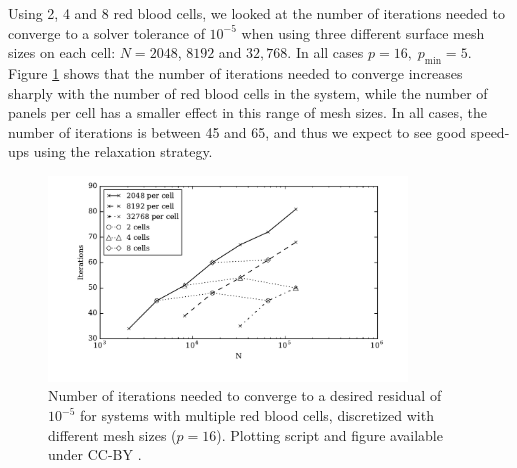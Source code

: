 \documentclass[final,3p,times]{elsarticle}
\begin{document}
Using 2, 4 and 8 red blood cells, we looked at the number of iterations needed to converge to a solver tolerance of $10^{-5}$ when using three different surface mesh sizes on each cell: $N=2048$, $8192$ and $32,768$. In all cases $p = 16,\;p_{\text{min}} = 5$. Figure \ref{fig:multiple_cell_iterations} shows that the number of iterations needed to converge increases sharply with the number of red blood cells in the system, while the number of panels per cell has a smaller effect in this range of mesh sizes. In all cases, the number of iterations is between 45 and 65, and thus we expect to see good speed-ups using the relaxation strategy.



\begin{figure}
\begin{center}
	\includegraphics[natwidth=7in,natheight=3.5in,width=0.85\textwidth]{EthrocyteMultipleCellIterations.pdf}
	\caption{Number of iterations needed to converge to a desired residual of $10^{-5}$ for systems with multiple red blood cells, discretized with different mesh sizes ($p = 16$). Plotting script and figure available under CC-BY \cite{WangLaytonBarba2016-figshare4}.}
	\label{fig:multiple_cell_iterations}
\end{center}
\end{figure}
\end{document}
